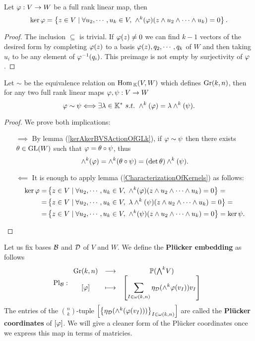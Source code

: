 \begin{lemma}\label{CharacterizationOfKernels}
Let $\varphi:V\to W$ be a full rank linear map, then
\[\ker\varphi=\left\{{z\in V\mid \forall u_2,\cdots, u_k\in V,\ \wedge^k(\varphi)(z\wedge u_2\wedge\cdots\wedge u_k)=0}\right\}.\]
\end{lemma}
\begin{proof}
The inclusion $\subseteq$ is trivial. If $\varphi(z)\neq 0$ we can find $k-1$ vectors of the desired form by completing $\varphi(z)$ to a basis $\varphi(z),q_2,\cdots,q_k$ of $W$ and then taking $u_i$ to be any element of $\varphi^{-1}(q_i)$. This preimage is not empty by surjectivity of $\varphi$.
\end{proof}

\begin{proposition}\label{PluckerMapInjectiveOnGrassmanniansUpToScalar}
Let $\sim$ be the equivalence relation on $\mathrm{Hom}\,_{\mathbb{K}}(V,W)$ which defines $\mathrm{Gr}(k,n)$, then for any two full rank linear maps $\varphi,\psi:V\to W$
\[\vp\sim \psi\coimplies \exists \la\in\K^\ast\ s.t.\ \wedge^k(\vp)=\la\wedge^k(\psi).\]
\end{proposition}
\begin{proof}
We prove both implications:
\setlength{\leftmargini}{1.2cm}
\begin{itemize}
\item[$\boxed{\implies}$] By lemma (\ref{kerAkerBVSActionOfGLk}), if $\varphi\sim \psi$ then there exists $\theta\in \mathrm{GL}(W)$ such that $\varphi=\theta\circ \psi$, thus
\[\wedge^k(\varphi)=\wedge^k(\theta\circ \psi)=(\det\theta) \wedge^k(\psi).\]
\item[$\boxed{\impliedby}$] It is enough to apply lemma (\ref{CharacterizationOfKernels}) as follows:
\begin{align*}
\ker\vp=&\cpa{z\in V\mid \forall u_2,\cdots, u_k\in V,\ \wedge^k(\vp)(z\wedge u_2\wedge \cdots\wedge u_k)=0}=\\
=&\cpa{z\in V\mid \forall u_2,\cdots, u_k\in V,\ \la\wedge^k(\psi)(z\wedge u_2\wedge\cdots\wedge u_k)=0}=\\
=&\cpa{z\in V\mid \forall u_2,\cdots, u_k\in V,\ \wedge^k(\psi)(z\wedge u_2\wedge \cdots\wedge u_k)=0}=\ker \psi.
\end{align*}
\end{itemize}
\setlength{\leftmargini}{0.5cm}
\end{proof}


\begin{definition}
Let us fix bases $\mathcal{B}$ and $\mathcal{D}$ of $V$ and $W$. We define the \textbf{Pl\"ucker embedding} as follows
\[\Pl_\Bc:\funcDef{\Gr(k,n)}{\Pj(\bw V)}{[\vp]}{\displaystyle\spa{\sum_{I\in \omega(k,n)} \eta_\Dc(\wedge^k\vp(v_I))v_I}}\]
The entries of the $\binom nk$-tuple $\left[{\left\{{\eta_{\mathcal{D}}(\wedge^k(\varphi(v_I)))}\right\}_{I\in\omega(k,n)}}\right]$ are called the \textbf{Pl\"ucker coordinates} of $[\varphi]$. We will give a cleaner form of the Pl\"ucker coordinates once we express this map in terms of matricies.
\end{definition}



